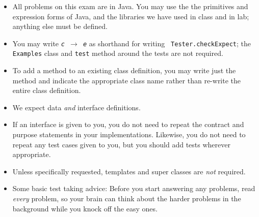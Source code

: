 \documentclass[12pt]{article}                   %
\begin{document}
\noindent\begin{minipage}{8cm}\sloppy
\begin{itemize}
\item All problems on this exam are in Java. You may use the the
  primitives and expression forms of Java, and the libraries we have
  used in class and in lab; anything else must be defined.

\item You may write {\tt {\slshape c} $\rightarrow$ {\slshape e}} as
  shorthand for writing {\tt
    Tester.checkExpect}; the {\tt Examples} class and {\tt test}
  method around the tests are not required.

\item To add a method to an existing class definition, you
  may write just the method and indicate the appropriate class name
  rather than re-write the entire class definition.

\item We expect data \emph{and} interface definitions.

\item If an interface is given to you, you do not need to repeat the
  contract and purpose statements in your implementations.  Likewise,
  you do not need to repeat any test cases given to you, but you
  should add tests wherever appropriate.



\item Unless specifically requested, templates and super classes are
  \emph{not} required.

\item Some basic test taking advice: Before you start answering
any problems, read \emph{every} problem, so your brain can  think
about the harder problems in the background while you knock off the easy ones.
\end{itemize}

\bigskip


\end{minipage}
\end{document}
